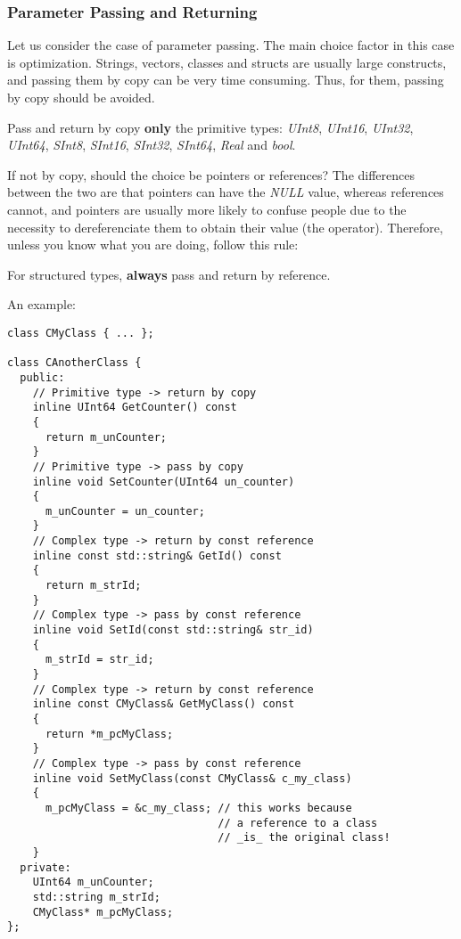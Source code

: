 \documentclass[a4paper]{article}
\begin{document}
\subsubsection{Parameter Passing and Returning}
Let us consider the case of parameter passing.  The main choice factor
in this case is optimization. Strings, vectors, classes and structs
are usually large constructs, and passing them by copy can be very
time consuming. Thus, for them, passing by copy should be avoided.
%
\begin{warning}
  Pass and return by copy {\bf only} the primitive types: {\it
    UInt8}, {\it UInt16}, {\it UInt32}, {\it UInt64}, {\it SInt8}, {\it
    SInt16}, {\it SInt32}, {\it SInt64}, {\it Real} and {\it bool}.
\end{warning}
%
If not by copy, should the choice be pointers or references? The
differences between the two are that pointers can have the {\it NULL}
value, whereas references cannot, and pointers are usually more likely
to confuse people due to the necessity to dereferenciate them to
obtain their value (the {\it *} operator). Therefore, unless you know
what you are doing, follow this rule:
\begin{warning}
  For structured types, {\bf always} pass and return by reference.
\end{warning}
An example:
\begin{lstlisting}
class CMyClass { ... };

class CAnotherClass {
  public:
    // Primitive type -> return by copy
    inline UInt64 GetCounter() const
    {
      return m_unCounter;
    }
    // Primitive type -> pass by copy
    inline void SetCounter(UInt64 un_counter)
    {
      m_unCounter = un_counter;
    }
    // Complex type -> return by const reference
    inline const std::string& GetId() const
    {
      return m_strId;
    }
    // Complex type -> pass by const reference
    inline void SetId(const std::string& str_id)
    {
      m_strId = str_id;
    }
    // Complex type -> return by const reference
    inline const CMyClass& GetMyClass() const
    {
      return *m_pcMyClass;
    }
    // Complex type -> pass by const reference
    inline void SetMyClass(const CMyClass& c_my_class)
    {
      m_pcMyClass = &c_my_class; // this works because
                                 // a reference to a class
                                 // _is_ the original class!
    }
  private:
    UInt64 m_unCounter;
    std::string m_strId;
    CMyClass* m_pcMyClass;
};
\end{lstlisting}
\end{document}
